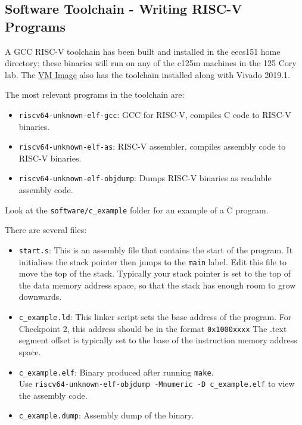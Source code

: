 \documentclass[11pt]{article}
\begin{document}
\subsection{Software Toolchain - Writing RISC-V Programs}
\label{toolchain}
A GCC RISC-V toolchain has been built and installed in the eecs151 home directory; these binaries will run on any of the c125m machines in the 125 Cory lab. The \href{https://berkeley.box.com/s/s4z0ykpf0tudrm9hce8fsmitpgb2khhe}{VM Image} also has the toolchain installed along with Vivado 2019.1.

The most relevant programs in the toolchain are:
\begin{itemize}
    \item \verb|riscv64-unknown-elf-gcc|: GCC for RISC-V, compiles C code to RISC-V binaries.
    \item \verb|riscv64-unknown-elf-as|: RISC-V assembler, compiles assembly code to RISC-V binaries.
    \item \verb|riscv64-unknown-elf-objdump|: Dumps RISC-V binaries as readable assembly code.
\end{itemize}

Look at the \verb|software/c_example| folder for an example of a C program.

There are several files:
\begin{itemize}
    \item \verb|start.s|: This is an assembly file that contains the start of the program.
      It initialises the stack pointer then jumps to the \verb|main| label.
      Edit this file to move the top of the stack.
      Typically your stack pointer is set to the top of the data memory address space, so that the stack has enough room to grow downwards.

    \item \verb|c_example.ld|: This linker script sets the base address of the program.
      For Checkpoint 2, this address should be in the format \verb|0x1000xxxx|
      The .text segment offset is typically set to the base of the instruction memory address space.

    \item \verb|c_example.elf|: Binary produced after running \verb|make|.\\Use \verb|riscv64-unknown-elf-objdump -Mnumeric -D c_example.elf| to view the assembly code.
    \item \verb|c_example.dump|: Assembly dump of the binary.
\end{itemize}
\end{document}
